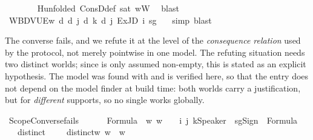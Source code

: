 \begin{isabellebody}
\ \ \ \ \ \ \isamarkupfalse%
\ H{\isacharbrackleft}{\kern0pt}unfolded\ ConsD{\isacharunderscore}{\kern0pt}def{\isacharbrackright}{\kern0pt}\ sat\ wW\ \isamarkupfalse%
\ blast\isanewline
\ \ \ \ \isamarkupfalse%
\ {\isachardoublequoteopen}{\isasymlangle}W{\isacharcomma}{\kern0pt}B{\isacharcomma}{\kern0pt}D{\isacharcomma}{\kern0pt}V{\isacharcomma}{\kern0pt}U{\isacharcomma}{\kern0pt}E{\isasymrangle}{\isacharcomma}{\kern0pt}w\ {\isasymTurnstile}\isactrlsup d\ {\isasymD}\isactrlsup d\ j\ {\isacharparenleft}{\kern0pt}{\isasymB}\isactrlsup d\ k\ {\isacharparenleft}{\kern0pt}{\isasymD}\isactrlsup d\ j\ {\isacharparenleft}{\kern0pt}ExJD\ i\ sg\ {\isasymphi}{\isacharparenright}{\kern0pt}{\isacharparenright}{\kern0pt}{\isacharparenright}{\kern0pt}{\isachardoublequoteclose}\ \isamarkupfalse%
\ simp\ blast\isanewline
\ \ \isamarkupfalse%
\isanewline
{}\isamarkupfalse%
%
\endisatagproof
{\isafoldproof}%
%
\isadelimproof
%
\endisadelimproof
%
\begin{isamarkuptext}%
The converse fails, and we refute it at the level of the \emph{consequence relation}
used by the protocol, not merely pointwise in one model. The refuting situation
needs two distinct worlds; since \isa{{\isasymw}} is only assumed non-empty, this is stated as an
explicit hypothesis. The model was found with  \cite{Nitpick2010} and is
verified here, so that the entry does not depend on the model finder at build
time: both worlds carry a justification, but for \emph{different} supports, so no single
\isa{{\isasymDelta}} works globally.%
\end{isamarkuptext}\isamarkuptrue%
\isamarkupfalse%
\ ScopeConverse{\isacharunderscore}{\kern0pt}fails{\isacharcolon}{\kern0pt}\isanewline
\ \ \ {\isasymphi}\ {\isasymphi}\ {\isacharcolon}{\kern0pt}{\isacharcolon}{\kern0pt}\ Formula\ \ w\ w\ {\isacharcolon}{\kern0pt}{\isacharcolon}{\kern0pt}\ {\isasymw}\ \ i\ j\ k{\isacharcolon}{\kern0pt}{\isacharcolon}{\kern0pt}Speaker\ \ sg{\isacharcolon}{\kern0pt}{\isacharcolon}{\kern0pt}Sign\ \ {\isasymphi}{\isacharcolon}{\kern0pt}{\isacharcolon}{\kern0pt}Formula\isanewline
\ \ \ distinct{\isasymDelta}{\isacharcolon}{\kern0pt}\ {\isachardoublequoteopen}{\isasymphi}\ {\isasymnoteq}\ {\isasymphi}\ \ distinctw{\isacharcolon}{\kern0pt}\ {\isachardoublequoteopen}w\ {\isasymnoteq}\ w\isanewline

\end{isabellebody}
